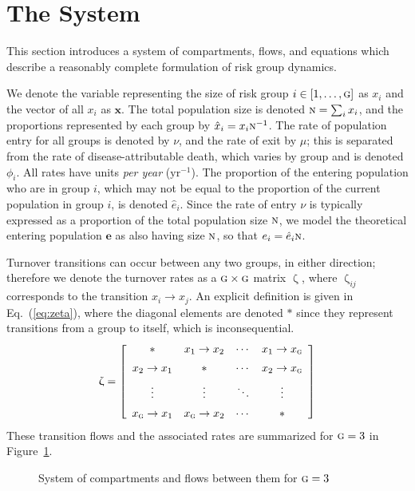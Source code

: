 \documentclass{article}
\numberwithin{equation}{section}
\renewcommand{\zeta}{\upzeta}
\newcommand{\x}{\hat{x}}
\newcommand{\e}{\hat{e}}
\newcommand{\N}{\textsc{n}}
\newcommand{\G}{\textsc{g}}
\begin{document}
\section{The System}\label{s:system}
This section introduces a system of compartments, flows, and equations
which describe a reasonably complete formulation of risk group dynamics.
\par
We denote the variable representing
the size of risk group $i \in [1, \dots, \G]$ as $x_i$
and the vector of all $x_i$ as $\bm{x}$.
The total population size is denoted $\N = \sum_i x_i$,
and the proportions represented by each group by $\x_i = x_i \N^{-1}$.
The rate of population entry for all groups is denoted by $\nu$, and
the rate of exit by $\mu$;
this is separated from
the rate of disease-attributable death, which varies by group and is denoted $\phi_i$.
All rates have units \textit{per year} ($\mathrm{yr}^{-1}$).
The proportion of the entering population who are in group $i$,
which may not be equal to the proportion of the current population in group $i$,
is denoted $\e_i$.
Since the rate of entry $\nu$ is typically expressed as
a proportion of the total population size $\N$,
we model the theoretical entering population $\bm{e}$ as also having size $\N$,
so that $e_i = \e_i \N$.
\par
Turnover transitions can occur between any two groups, in either direction;
therefore we denote the turnover rates as a $\G \times \G$ matrix $\zeta$,
where $\zeta_{ij}$ corresponds to the transition $x_i \rightarrow x_j$.
An explicit definition is given in Eq.~(\ref{eq:zeta}),
where the diagonal elements are denoted $*$ since they represent
transitions from a group to itself, which is inconsequential.
\begin{equation}\label{eq:zeta}
\zeta = \left[\begin{array}{cccc}
         *           & x_1  \rightarrow x_2 & \cdots & x_1 \rightarrow x_\G \\[0.5em]
x_2  \rightarrow x_1 &          *           & \cdots & x_2 \rightarrow x_\G \\[0.5em]
      \vdots         &       \vdots         & \ddots &       \vdots         \\[0.5em]
x_\G \rightarrow x_1 & x_\G \rightarrow x_2 & \cdots &          *
\end{array}\right]
\end{equation}
These transition flows and the associated rates are summarized for $\G = 3$ in Figure~\ref{fig:system}.
\begin{figure}[h]
  \centering
  \caption{System of compartments and flows between them for $\G = 3$}
  \label{fig:system}
\end{figure}
\end{document}
